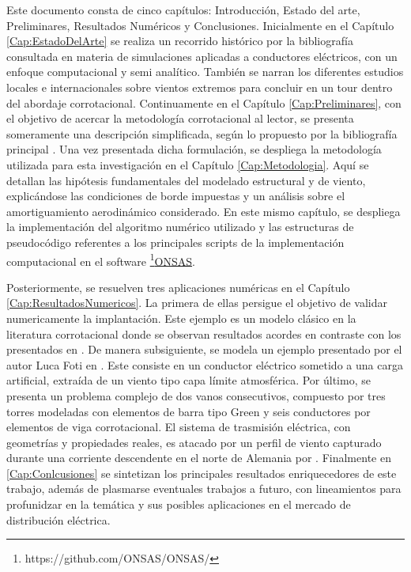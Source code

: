  Este documento consta de cinco capítulos: Introducción, Estado del arte, Preliminares, Resultados Numéricos y Conclusiones. Inicialmente en el Capítulo \ref{Cap:EstadoDelArte} se realiza un recorrido histórico por la bibliografía consultada en materia de simulaciones aplicadas a conductores eléctricos, con un enfoque computacional y semi analítico. También se narran los diferentes estudios locales e internacionales sobre vientos extremos para concluir en un tour dentro del abordaje corrotacional. Continuamente en el Capítulo \ref{Cap:Preliminares}, con el objetivo de acercar la metodología corrotacional al lector, se presenta someramente una descripción simplificada, según lo propuesto por la bibliografía principal \citet{Le2014}. Una vez presentada dicha formulación, se despliega la metodología utilizada para esta investigación en el Capítulo \ref{Cap:Metodologia}. Aquí se detallan las hipótesis fundamentales del modelado estructural y de viento, explicándose las condiciones de borde impuestas y un análisis sobre el amortiguamiento aerodinámico considerado. En este mismo capítulo, se despliega la implementación del algoritmo numérico utilizado y las estructuras de pseudocódigo referentes a los principales scripts de la implementación computacional en el software \footnote{https://github.com/ONSAS/ONSAS/}\href{https://github.com/ONSAS/ONSAS/}{ONSAS}. 
 
 Posteriormente, se resuelven tres aplicaciones numéricas en el Capítulo \ref{Cap:ResultadosNumericos}. La primera de ellas persigue el objetivo de validar numericamente la implantación. Este ejemplo es un modelo clásico en la literatura corrotacional donde se observan resultados acordes en contraste con los presentados en \cite{Le2014}. De manera subsiguiente, se modela un ejemplo presentado por el autor Luca Foti en \cite{Foti2016}. Este consiste en un conductor eléctrico sometido a una carga artificial, extraída de un viento tipo capa límite atmosférica. Por último, se presenta un problema complejo de dos vanos consecutivos, compuesto por tres torres modeladas con elementos de barra tipo Green y seis conductores por elementos de viga corrotacional. El sistema de trasmisión eléctrica, con geometrías y propiedades reales, es atacado por un perfil de viento capturado durante una corriente descendente en el norte de Alemania por \cite{stengel2017measurements}. Finalmente en  \ref{Cap:Conlcusiones} se sintetizan los principales resultados enriquecedores de este trabajo, además de plasmarse eventuales trabajos a futuro, con lineamientos para profunidzar en la temática y sus posibles aplicaciones en el mercado de distribución eléctrica.